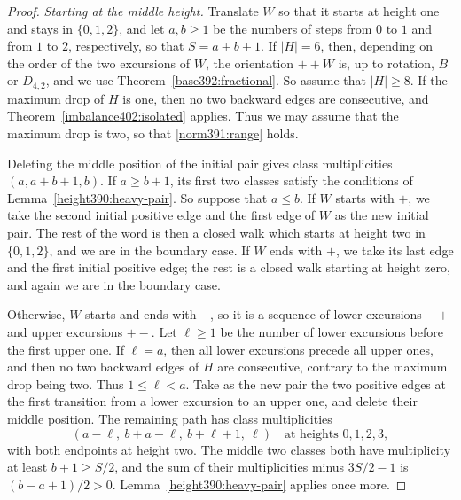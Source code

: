 \begin{proof}
\emph{Starting at the middle height.} Translate $W$ so that it starts at height one and stays in $\{0,1,2\}$,
and let $a,b\ge1$ be the numbers of steps from $0$ to $1$ and from $1$ to $2$, respectively, so that $S=a+b+1$. If $|H|=6$, then, depending on the order of the two excursions of $W$, the orientation $++W$ is, up to rotation,
$B$ or $D_{4,2}$, and we use
Theorem~\ref{base392:fractional}. So assume that $|H|\ge8$.
If the maximum drop of $H$ is one, then no two backward edges are consecutive, and
Theorem~\ref{imbalance402:isolated} applies. Thus we may assume that the maximum drop is two, so that \eqref{norm391:range} holds.

Deleting the middle position of the initial pair gives class multiplicities $(a,a+b+1,b)$.
If $a\ge b+1$, its first two classes satisfy the conditions of Lemma~\ref{height390:heavy-pair}. So suppose that $a\le b$. If $W$ starts with $+$,
we take the second initial positive edge and the first edge of $W$ as the new initial pair. The rest of the word is then a closed walk which starts at height two in $\{0,1,2\}$, and we are in the boundary case.
If $W$ ends with $+$, we take its last edge and the first initial positive edge; the rest is a closed walk starting at height zero, and again we are in the boundary case.

Otherwise, $W$ starts and ends with $-$, so it is a sequence of
lower excursions $-+$ and upper excursions $+-$.
Let $\ell\ge1$ be the number of lower excursions before the first upper one. If $\ell=a$,
then all lower excursions precede all upper ones, and then no two backward edges of $H$ are consecutive, contrary to the maximum drop being two. Thus $1\le\ell<a$.
Take as the new pair the two positive edges at the first transition from a lower excursion to an upper one, and delete their middle position. The remaining path has class multiplicities
\[
 (a-\ell,\ b+a-\ell,\ b+\ell+1,\ \ell)
 \quad\text{at heights }0,1,2,3,
\]
with both endpoints at height two. The middle two classes both have multiplicity
at least $b+1\ge S/2$, and the sum of their multiplicities minus $3S/2-1$ is
$(b-a+1)/2>0$. Lemma~\ref{height390:heavy-pair} applies once more.
\end{proof}
